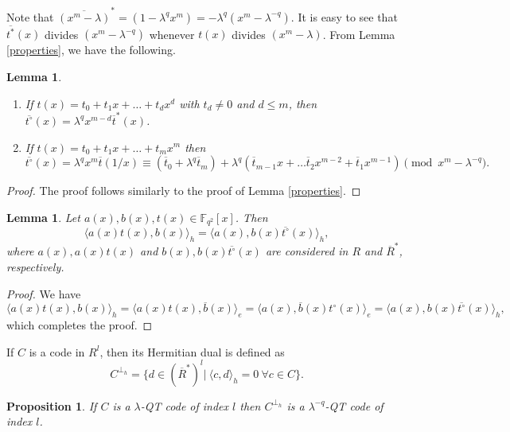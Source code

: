 \documentclass[12 pt]{extarticle}
\numberwithin{equation}{section}
\newtheorem{proposition}[theorem]{Proposition}
\newtheorem{lemma}[theorem]{Lemma}
\theoremstyle{definition}
\begin{document}
Note that $\overline{(x^m-\lambda)}^*=(1-\lambda^q x^m)=-\lambda^{q} (x^m-\lambda^{-q})$. It is easy to see that $\overline{t^*}(x)$ divides $(x^m-\lambda^{-q})$ whenever $t(x)$ divides $(x^m-\lambda)$. From Lemma \ref{properties}, we have the following.
\begin{lemma}
\begin{enumerate}[(1)]
    \item  If $t(x)=t_0+t_1x+\dots+t_dx^d$ with $t_d\neq 0$ and $d\leq m$, then $\overline{t^\circ}(x)=\lambda^q x^{m-d} \overline{t}^*(x)$.
 \item If $t(x)=t_0+t_1x+\dots+t_mx^m$ then $$\overline{t^\circ}(x)=\lambda^q x^m\overline{t}(1/x)\equiv (\overline{t}_0+\lambda^q\overline{ t}_m)+ \lambda^q (\overline{t}_{m-1}x+\dots \overline{t}_2x^{m-2}+\overline{t}_1x^{m-1})\pmod {x^m-\lambda^{-q}}.$$
   \end{enumerate}
\end{lemma}
\begin{proof}
   The proof follows similarly to the proof of Lemma \ref{properties}.
\end{proof}
\begin{lemma}
    Let $a(x),b(x),t(x)\in \mathbb{F}_{q^2}[x]$. Then
    $$\langle a(x)t(x),b(x)\rangle_h=\langle a(x),b(x)\overline{t^\circ}(x)\rangle_h,$$
    where $a(x),a(x)t(x)$ and $b(x),b(x)\overline{t^\circ}(x)$ are considered in $R$ and $\overline{R}^*$, respectively.
\end{lemma}
\begin{proof}
We have
    \begin{equation*}
      \langle a(x)t(x),b(x)\rangle_h=\langle a(x)t(x),\overline{b}(x)\rangle_e=\langle a(x),\overline{b}(x)t^{\circ}(x)\rangle_e=\langle a(x),b(x)\overline{t^{\circ}}(x)\rangle_h, 
    \end{equation*}
which completes the proof. 
\end{proof}

If $C$ is a code in $R^l$, then its Hermitian dual is defined as 
$$C^{\perp_h}=\{d\in (\overline{R}^*)^l | \ \langle c, d \rangle_h=0 \ \forall c\in C\}.$$


\begin{proposition}\cite[Proposition 6.2]{sangwisut2017}\label{hqdual}
    If $C$ is a $\lambda$-QT code of index $l$ then $C^{\perp_h}$ is a $\lambda^{-q}$-QT code of index $l$. 
\end{proposition}
\end{document}
